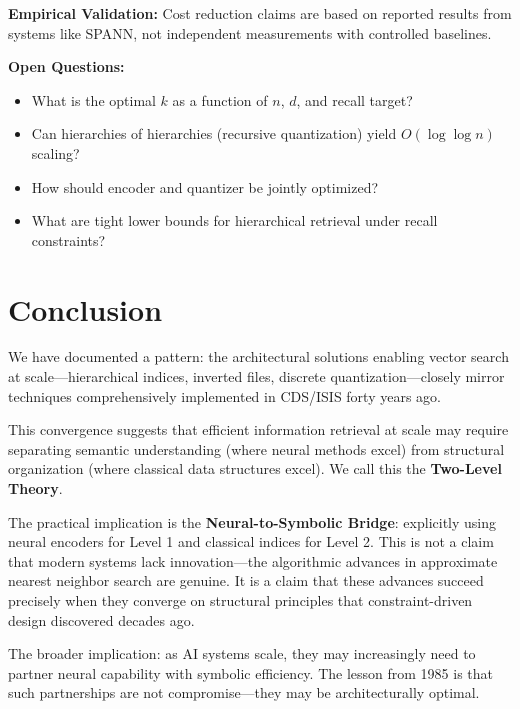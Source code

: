 \documentclass[manuscript,screen,nonacm]{acmart}
\begin{document}
\textbf{Empirical Validation:} Cost reduction claims are based on reported results from systems like SPANN, not independent measurements with controlled baselines.

\textbf{Open Questions:}
\begin{itemize}
    \item What is the optimal $k$ as a function of $n$, $d$, and recall target?
    \item Can hierarchies of hierarchies (recursive quantization) yield $O(\log \log n)$ scaling?
    \item How should encoder and quantizer be jointly optimized?
    \item What are tight lower bounds for hierarchical retrieval under recall constraints?
\end{itemize}

\section{Conclusion}

We have documented a pattern: the architectural solutions enabling vector search at scale---hierarchical indices, inverted files, discrete quantization---closely mirror techniques comprehensively implemented in CDS/ISIS forty years ago.

This convergence suggests that efficient information retrieval at scale may require separating semantic understanding (where neural methods excel) from structural organization (where classical data structures excel). We call this the \textbf{Two-Level Theory}.

The practical implication is the \textbf{Neural-to-Symbolic Bridge}: explicitly using neural encoders for Level 1 and classical indices for Level 2. This is not a claim that modern systems lack innovation---the algorithmic advances in approximate nearest neighbor search are genuine. It is a claim that these advances succeed precisely when they converge on structural principles that constraint-driven design discovered decades ago.

The broader implication: as AI systems scale, they may increasingly need to partner neural capability with symbolic efficiency. The lesson from 1985 is that such partnerships are not compromise---they may be architecturally optimal.
\end{document}
